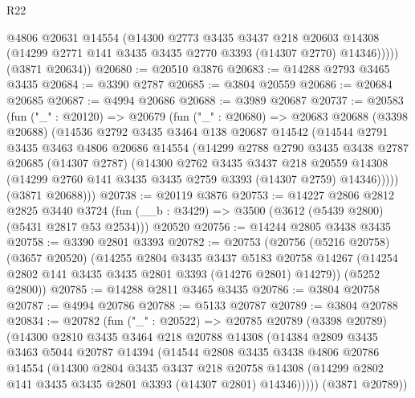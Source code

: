\begin{lexlean}{R22}
\begin{coremodule}
            @4806
            @20631
            @14554
            (@14300
              @2773
              @3435
              @3437
              @218
              @20603
              @14308
              (@14299 @2771 @141 @3435 @3435 @2770 @3393 (@14307 @2770) @14346)))))
      (@3871 @20634))
@20680 := @20510 @3876
@20683 := @14288 @2793 @3465 @3435
@20684 := @3390 @2787
@20685 := @3804 @20559
@20686 := @20684 @20685
@20687 := @4994 @20686
@20688 := @3989 @20687
@20737 := @20583
    (fun ("_" : @20120) =>
    @20679
      (fun ("_" : @20680) =>
      @20683
        @20688
        (@3398 @20688)
        (@14536
          @2792
          @3435
          @3464
          @138
          @20687
          @14542
          (@14544
            @2791
            @3435
            @3463
            @4806
            @20686
            @14554
            (@14299
              @2788
              @2790
              @3435
              @3438
              @2787
              @20685
              (@14307 @2787)
              (@14300
                @2762
                @3435
                @3437
                @218
                @20559
                @14308
                (@14299 @2760 @141 @3435 @3435 @2759 @3393 (@14307 @2759) @14346)))))
        (@3871 @20688)))
@20738 := @20119 @3876
@20753 := @14227
    @2806
    @2812
    @2825
    @3440
    @3724
    (fun (__b : @3429) => @3500 (@3612 (@5439 @2800) (@5431 @2817 @53 @2534)))
    @20520
@20756 := @14244 @2805 @3438 @3435
@20758 := @3390 @2801 @3393
@20782 := @20753
    (@20756
      (@5216 @20758)
      (@3657 @20520)
      (@14255
        @2804
        @3435
        @3437
        @5183
        @20758
        @14267
        (@14254 @2802 @141 @3435 @3435 @2801 @3393 (@14276 @2801) @14279))
      (@5252 @2800))
@20785 := @14288 @2811 @3465 @3435
@20786 := @3804 @20758
@20787 := @4994 @20786
@20788 := @5133 @20787
@20789 := @3804 @20788
@20834 := @20782
    (fun ("_" : @20522) =>
    @20785
      @20789
      (@3398 @20789)
      (@14300
        @2810
        @3435
        @3464
        @218
        @20788
        @14308
        (@14384
          @2809
          @3435
          @3463
          @5044
          @20787
          @14394
          (@14544
            @2808
            @3435
            @3438
            @4806
            @20786
            @14554
            (@14300
              @2804
              @3435
              @3437
              @218
              @20758
              @14308
              (@14299 @2802 @141 @3435 @3435 @2801 @3393 (@14307 @2801) @14346)))))
      (@3871 @20789))

\end{coremodule}
\end{lexlean}

